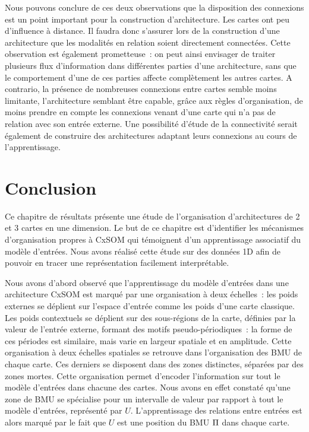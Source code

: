 \documentclass[../main]{subfiles}
\begin{document}
Nous pouvons conclure de ces deux observations que la disposition des connexions est un point important pour la construction d'architecture.
Les cartes ont peu d'influence à distance. Il faudra donc s'assurer lors de la construction d'une architecture que les modalités en relation soient directement connectées. Cette observation est également prometteuse~: on peut ainsi envisager de traiter plusieurs flux d'information dans différentes parties d'une architecture, sans que le comportement d'une de ces parties affecte complètement les autres cartes.
A contrario, la présence de nombreuses connexions entre cartes semble moins limitante, l'architecture semblant être capable, grâce aux règles d'organisation, de moins prendre en compte les connexions venant d'une carte qui n'a pas de relation avec son entrée externe. 
Une possibilité d'étude de la connectivité serait également de construire des architectures adaptant leurs connexions au cours de l'apprentissage.

\section{Conclusion}

Ce chapitre de résultats présente une étude de l'organisation d'architectures de 2 et 3 cartes en une dimension.
Le but de ce chapitre est d'identifier les mécanismes d'organisation propres à CxSOM qui témoignent d'un apprentissage associatif du modèle d'entrées. Nous avons réalisé cette étude sur des données 1D afin de pouvoir en tracer une représentation facilement interprétable.

Nous avons d'abord observé que l'apprentissage du modèle d'entrées dans une architecture CxSOM est marqué par une organisation à deux échelles~: les poids externes se déplient sur l'espace d'entrée comme les poids d'une carte classique. Les poids contextuels se déplient sur des sous-régions de la carte, définies par la valeur de l'entrée externe, formant des motifs pseudo-périodiques~: la forme de ces périodes est similaire, mais varie en largeur spatiale et en amplitude. 
Cette organisation à deux échelles spatiales se retrouve dans l'organisation des BMU de chaque carte.
Ces derniers se disposent dans des zones distinctes, séparées par des zones mortes. 
Cette organisation permet d'encoder l'information sur tout le modèle d'entrées dans chacune des cartes. Nous avons en effet constaté qu'une zone de BMU se spécialise pour un intervalle de valeur par rapport à tout le modèle d'entrées, représenté par $U$. L'apprentissage des relations entre entrées est alors marqué par le fait que $U$ est une position du BMU $\Pi$ dans chaque carte.
\end{document}
